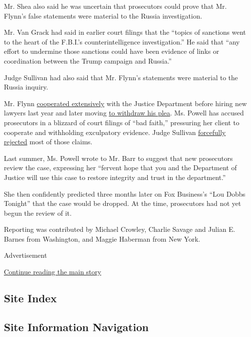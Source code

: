 Mr. Shea also said he was uncertain that prosecutors could prove that
Mr. Flynn's false statements were material to the Russia investigation.

Mr. Van Grack had said in earlier court filings that the ``topics of
sanctions went to the heart of the F.B.I.'s counterintelligence
investigation.'' He said that ``any effort to undermine those sanctions
could have been evidence of links or coordination between the Trump
campaign and Russia.''

Judge Sullivan had also said that Mr. Flynn's statements were material
to the Russia inquiry.

Mr. Flynn
\href{https://www.nytimes.com/2018/12/04/us/politics/michael-flynn-special-counsel-sentencing-memo.html}{cooperated
extensively} with the Justice Department before hiring new lawyers last
year and later moving
\href{https://www.nytimes.com/2020/01/14/us/politics/michael-flynn-withdraws-guilty-plea.html}{to
withdraw his plea}. Ms. Powell has accused prosecutors in a blizzard of
court filings of ``bad faith,'' pressuring her client to cooperate and
withholding exculpatory evidence. Judge Sullivan
\href{https://www.nytimes.com/2019/12/16/us/politics/michael-flynn-sentencing.html}{forcefully
rejected} most of those claims.

Last summer, Ms. Powell wrote to Mr. Barr to suggest that new
prosecutors review the case, expressing her ``fervent hope that you and
the Department of Justice will use this case to restore integrity and
trust in the department.''

She then confidently predicted three months later on Fox Business's
``Lou Dobbs Tonight'' that the case would be dropped. At the time,
prosecutors had not yet begun the review of it.

Reporting was contributed by Michael Crowley, Charlie Savage and Julian
E. Barnes from Washington, and Maggie Haberman from New York.

Advertisement

\protect\hyperlink{after-bottom}{Continue reading the main story}

\hypertarget{site-index}{%
\subsection{Site Index}\label{site-index}}

\hypertarget{site-information-navigation}{%
\subsection{Site Information
Navigation}\label{site-information-navigation}}

